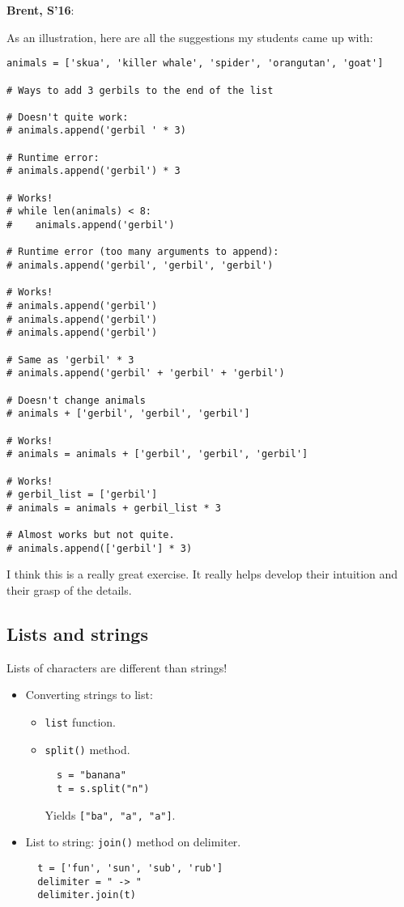 \documentclass{article}
\newenvironment{reflect}[1]
{
  \noindent
  \begin{lrbox}{\reflectbox}
    \begin{minipage}[t]{\textwidth}
      \textbf{#1}:
}{
    \end{minipage}
  \end{lrbox}
  \fbox{\usebox{\reflectbox}}
}
\begin{document}
\begin{reflect}{Brent, S'16}
  As an illustration, here are all the suggestions my students came up
  with:
\begin{verbatim}
animals = ['skua', 'killer whale', 'spider', 'orangutan', 'goat']

# Ways to add 3 gerbils to the end of the list

# Doesn't quite work:
# animals.append('gerbil ' * 3)

# Runtime error:
# animals.append('gerbil') * 3

# Works!
# while len(animals) < 8:
#    animals.append('gerbil')

# Runtime error (too many arguments to append):
# animals.append('gerbil', 'gerbil', 'gerbil')

# Works!
# animals.append('gerbil')
# animals.append('gerbil')
# animals.append('gerbil')

# Same as 'gerbil' * 3
# animals.append('gerbil' + 'gerbil' + 'gerbil')

# Doesn't change animals
# animals + ['gerbil', 'gerbil', 'gerbil']

# Works!
# animals = animals + ['gerbil', 'gerbil', 'gerbil']

# Works!
# gerbil_list = ['gerbil']
# animals = animals + gerbil_list * 3

# Almost works but not quite.
# animals.append(['gerbil'] * 3)
\end{verbatim}

  I think this is a really great exercise. It really helps develop
  their intuition and their grasp of the details.
\end{reflect}

\subsection*{Lists and strings}

Lists of characters are different than strings!

\begin{itemize}
\item Converting strings to list:
  \begin{itemize}
  \item \verb|list| function.
  \item \verb|split()| method.
\begin{verbatim}
  s = "banana"
  t = s.split("n")
\end{verbatim}
Yields \verb|["ba", "a", "a"]|.

  \end{itemize}
\item List to string: \verb|join()| method on delimiter.
\begin{verbatim}
  t = ['fun', 'sun', 'sub', 'rub']
  delimiter = " -> "
  delimiter.join(t)
\end{verbatim}
\end{itemize}
\end{document}
